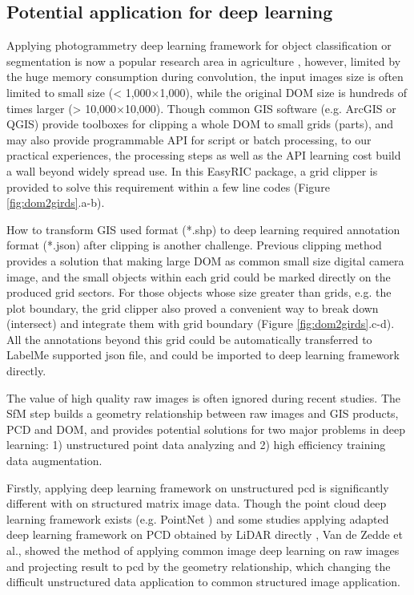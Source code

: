\documentclass{configs/bmcart}
\begin{document}
\subsection*{Potential application for deep learning}
Applying photogrammetry deep learning framework for object classification or segmentation is now a popular research area in agriculture \cite{zhou_fast_2020, feng_evaluation_2020, desai_automatic_2019}, however, limited by the huge memory consumption during convolution, the input images size is often limited to small size (< 1,000$\times$1,000), while the original DOM size is hundreds of times larger (> 10,000$\times$10,000). Though common GIS software (e.g. ArcGIS or QGIS) provide toolboxes for clipping a whole DOM to small grids (parts), and may also provide programmable API for script or batch processing, to our practical experiences, the processing steps as well as the API learning cost build a wall beyond widely spread use. In this EasyRIC package, a grid clipper is provided to solve this requirement within a few line codes (Figure \ref{fig:dom2girds}.a-b).

How to transform GIS used format (*.shp) to deep learning required annotation format (*.json) after clipping is another challenge. Previous clipping method provides a solution that making large DOM as common small size digital camera image, and the small objects within each grid could be marked directly on the produced grid sectors. For those objects whose size greater than grids, e.g. the plot boundary, the grid clipper also proved a convenient way to break down (intersect) and integrate them with grid boundary (Figure \ref{fig:dom2girds}.c-d). All the annotations beyond this grid could be automatically transferred to LabelMe supported json file, and could be imported to deep learning framework directly.

The value of high quality raw images is often ignored during recent studies. The SfM step builds a geometry relationship between raw images and GIS products, PCD and DOM, and provides potential solutions for two major problems in deep learning: 1) unstructured point data analyzing and 2) high efficiency training data augmentation.

Firstly, applying deep learning framework on unstructured \acrshort*{pcd} is significantly different with on structured matrix image data. Though the point cloud deep learning framework exists (e.g. PointNet \cite{qi_pointnet_2017}) and some studies applying adapted deep learning framework on PCD obtained by LiDAR directly \cite{jin_deep_2018, jin_stemleaf_2019, jin_non-destructive_2020}, Van de Zedde et al., \cite{van_plant-part_2019} showed the method of applying common image deep learning on raw images and projecting result to \acrshort*{pcd} by the geometry relationship, which changing the difficult unstructured data application to common structured image application.
\end{document}
